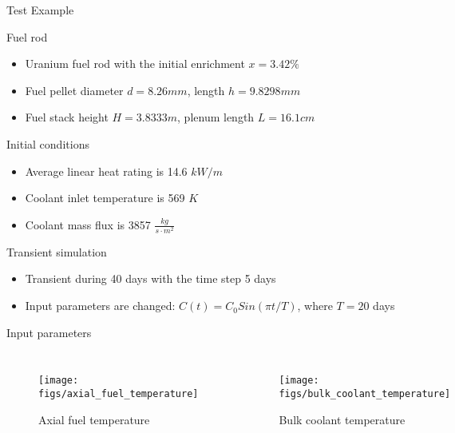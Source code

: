 \documentclass[11pt]{beamer}
\begin{document}
\begin{frame}{Test Example}
  
  \footnotesize

  \begin{block}{Fuel rod}
    \begin{itemize}
    \item Uranium fuel rod with the initial enrichment $x=3.42\%$    
    \item Fuel pellet diameter $d=8.26 mm$, length $h=9.8298 mm$
    \item Fuel stack height $H=3.8333 m$, plenum length $L=16.1 cm$
    \end{itemize}
  \end{block}

  \begin{block}{Initial conditions}
    \begin{itemize}
    \item Average linear heat rating is 14.6 $kW/m$
    \item Coolant inlet temperature is 569 $K$
    \item Coolant mass flux is 3857 $\frac{kg}{s \cdot m^2}$
    \end{itemize}
  \end{block}

  \begin{block}{Transient simulation}
    \begin{itemize}
    \item Transient during 40 days with the time step 5 days
    \item Input parameters are changed: $C(t) = C_0 Sin(\pi t/T)$, where $T=20$ days
    \end{itemize}
  \end{block}

\end{frame}



\begin{frame}{Input parameters}
  \footnotesize 
  
  \begin{columns}[t]


  \begin{figure}[h]
    \texttt{[image: figs/axial\_fuel\_temperature]}
    \caption{Axial fuel temperature}
    \label{fig:tfuel}
  \end{figure}  


  \begin{figure}[h]
    \texttt{[image: figs/bulk\_coolant\_temperature]}    
    \caption{Bulk coolant temperature}
    \label{fig:tcool}
  \end{figure}  
  
  \end{columns}

\end{frame}
\end{document}
